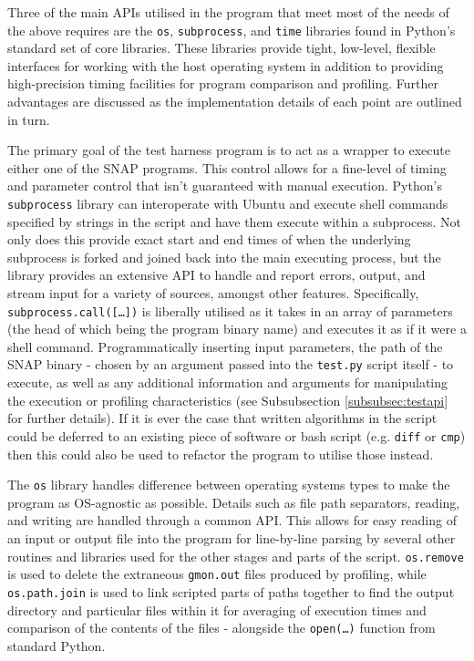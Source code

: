 \documentclass[conference]{IEEEtran}
\begin{document}
Three of the main APIs utilised in the program that meet most of the needs of the above requires are the \texttt{os}, \texttt{subprocess}, and \texttt{time} libraries found in Python's standard set of core libraries. These libraries provide tight, low-level, flexible interfaces for working with the host operating system in addition to providing high-precision timing facilities for program comparison and profiling. Further advantages are discussed as the implementation details of each point are outlined in turn.

The primary goal of the test harness program is to act as a wrapper to execute either one of the SNAP programs. This control allows for a fine-level of timing and parameter control that isn't guaranteed with manual execution. Python's \texttt{subprocess} library can interoperate with Ubuntu and execute shell commands specified by strings in the script and have them execute within a subprocess. Not only does this provide exact start and end times of when the underlying subprocess is forked and joined back into the main executing process, but the library provides an extensive API to handle and report errors, output, and stream input for a variety of sources, amongst other features. Specifically, \texttt{subprocess.call([\dots])} is liberally utilised as it takes in an array of parameters (the head of which being the program binary name) and executes it as if it were a shell command. Programmatically inserting input parameters, the path of the SNAP binary - chosen by an argument passed into the \texttt{test.py} script itself - to execute, as well as any additional information and arguments for manipulating the execution or profiling characteristics (see Subsubsection \ref{subsubsec:testapi} for further details). If it is ever the case that written algorithms in the script could be deferred to an existing piece of software or bash script (e.g. \texttt{diff} or \texttt{cmp}) then this could also be used to refactor the program to utilise those instead.

The \texttt{os} library handles difference between operating systems types to make the program as OS-agnostic as possible. Details such as file path separators, reading, and writing are handled through a common API. This allows for easy reading of an input or output file into the program for line-by-line parsing by several other routines and libraries used for the other stages and parts of the script. \texttt{os.remove} is used to delete the extraneous \texttt{gmon.out} files produced by profiling, while \texttt{os.path.join} is used to link scripted parts of paths together to find the output directory and particular files within it for averaging of execution times and comparison of the contents of the files - alongside the \texttt{open(\dots)} function from standard Python.
\end{document}
